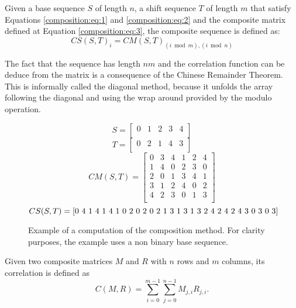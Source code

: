 \begin{definition}
  Given a base sequence $S$ of length $n$, a shift sequence $T$ of
  length $m$ that satisfy Equations \eqref{composition:eq:1} and 
  \eqref{composition:eq:2} and the composite matrix defined at Equation
  \eqref{composition:eq:3}, the composite sequence is defined as:
  \begin{equation}
    CS(S, T)_{i} = CM(S, T)_{(i \bmod m), (i \bmod n)}
  \end{equation}
\end{definition}
The fact that the sequence has length $nm$ and the correlation function can be deduce from the matrix is a consequence of the Chinese Remainder Theorem.  This is informally called the diagonal method, because it unfolds the array following the diagonal and using the wrap around provided by the modulo operation.
\begin{figure}[ht!]
  $$S = \begin{bmatrix}
    0 & 1 & 2 & 3 & 4\\
  \end{bmatrix}$$
  $$T = \begin{bmatrix}
    0 & 2 & 1 & 4 & 3 \\
  \end{bmatrix}
  $$
  $$CM(S, T) = \begin{bmatrix}
  0 & 3 & 4 & 1 & 2 & 4\\
  1 & 4 & 0 & 2 & 3 & 0\\
  2 & 0 & 1 & 3 & 4 & 1\\
  3 & 1 & 2 & 4 & 0 & 2\\
  4 & 2 & 3 & 0 & 1 & 3\\
  \end{bmatrix}
  $$
  $$CS(S, T) = \text{[0 4 1 4 1 4 1 0 2 0 2 0 2 1 3 1 3 1 3 2 4 2 4 2 4 3 0 3 0 3]}\\
  $$
  \caption{Example of a computation of the composition method. For clarity purposes, the example uses a non binary base sequence.}
  \label{}
\end{figure}

\begin{definition}
  Given two composite matrices $M$ and $R$ with $n$ rows and $m$ columns,
  its correlation is defined as
  \begin{equation}
    C(M, R) = \sum_{i=0}^{m-1}\sum_{j=0}^{n-1}M_{j, i}R_{j,i}.
  \end{equation}
\end{definition}

